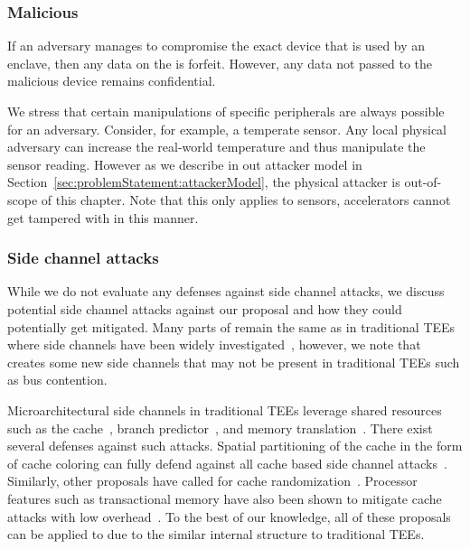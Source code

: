 \subsubsection{Malicious \sphw}
If an adversary manages to compromise the exact device that is used by an enclave, then any data on the \sphw is forfeit. However, any data not passed to the malicious device remains confidential.

We stress that certain manipulations of specific peripherals are always possible for an adversary. Consider, for example, a temperate sensor. Any local physical adversary can increase the real-world temperature and thus manipulate the sensor reading. However as we describe in out attacker model in Section~\ref{sec:problemStatement:attackerModel}, the physical attacker is out-of-scope of this chapter. Note that this only applies to sensors, accelerators cannot get tampered with in this manner.

\subsubsection{Side channel attacks}
While we do not evaluate any defenses against side channel attacks, we discuss potential side channel attacks against our proposal and how they could potentially get mitigated. Many parts of \name{} remain the same as in traditional TEEs where side channels have been widely investigated~\cite{brasser2017software,brasser2019dr,gruss2017strongsidechannel}, however, we note that \name{} creates some new side channels that may not be present in traditional TEEs such as bus contention. 

\setcounter{para}{0}
Microarchitectural side channels in traditional TEEs leverage shared resources such as the cache~\cite{brasser2017software}, branch predictor~\cite{lee2017inferring}, and memory translation~\cite{xu2015controlled}. There exist several defenses against such attacks. Spatial partitioning of the cache in the form of cache coloring can fully defend against all cache based side channel attacks~\cite{costan2016sanctum,zhang2009cachecoloring,zhaosonicboom}. Similarly, other proposals have called for cache randomization~\cite{brasser2019dr,werner2019scattercache}. Processor features such as transactional memory have also been shown to mitigate cache attacks with low overhead~\cite{gruss2017strongsidechannel}. To the best of our knowledge, all of these proposals can be applied to \name{} due to the similar internal structure to traditional TEEs.

